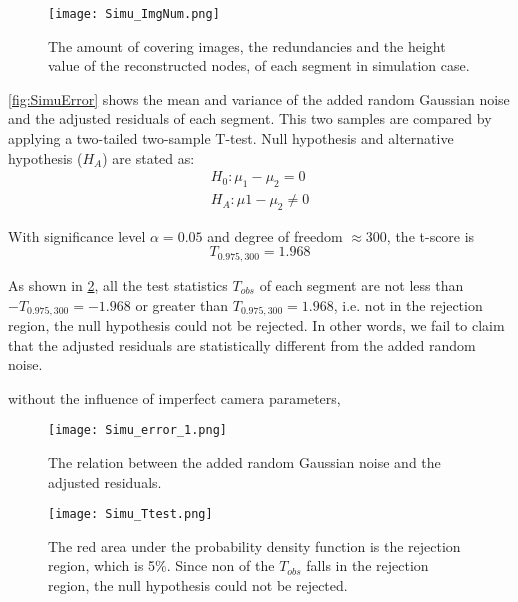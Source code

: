 \begin{figure}
  \centering
  \texttt{[image: Simu\_ImgNum.png]}
  \caption{\small The amount of covering images, the redundancies and the height value of the reconstructed nodes, of each segment in simulation case.}
  \label{fig:SimuImgNum}
\end{figure}

\cref{fig:SimuError} shows the mean and variance of the added random Gaussian noise and the adjusted residuals of each segment. This two samples are compared by applying a two-tailed two-sample T-test. Null hypothesis and alternative hypothesis ($H_A$) are stated as:
\begin{equation*}
\begin{split}
H_0: \mu_1-\mu_2=0\\
H_A: \mu1-\mu_2\neq0
\end{split}
\end{equation*}

With significance level $\alpha=0.05$ and degree of freedom $\approx300$, the t-score is 
\begin{equation*}
T_{0.975,300}=1.968
\end{equation*}

As shown in \cref{fig:SimuTtest}, all the test statistics $T_{obs}$ of each segment are not less than $-T_{0.975,300}=-1.968$ or greater than $T_{0.975,300}=1.968$, i.e. not in the rejection region, the null hypothesis could not be rejected. In other words, we fail to claim that the adjusted residuals are statistically different from the added random noise.

without the influence of imperfect camera parameters, 
\begin{figure}
  \centering
  \texttt{[image: Simu\_error\_1.png]}
  \caption{\small The relation between the added random Gaussian noise and the adjusted residuals.}
  \label{fig:SimuError}
  \vspace{1cm}
  \centering
  \texttt{[image: Simu\_Ttest.png]}
  \caption{\small The red area under the probability density function is the rejection region, which is 5\%. Since non of the $T_{obs}$ falls in the rejection region, the null hypothesis could not be rejected.}
  \label{fig:SimuTtest}
\end{figure}

\clearpage


